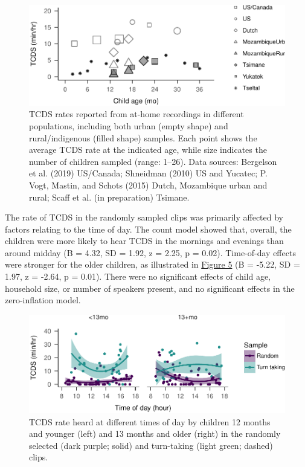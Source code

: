 \documentclass[floatsintext,man]{apa6}
\theoremstyle{definition}
\theoremstyle{definition}
\theoremstyle{definition}
\theoremstyle{remark}
\begin{document}
\begin{figure}
\centering
\includegraphics{Tseltal-CLE_files/figure-latex/fig4-1.pdf}
\caption{\label{fig:fig4}TCDS rates reported from at-home recordings in
different populations, including both urban (empty shape) and
rural/indigenous (filled shape) samples. Each point shows the average
TCDS rate at the indicated age, while size indicates the number of
children sampled (range: 1--26). Data sources: Bergelson et al. (2019)
US/Canada; Shneidman (2010) US and Yucatec; P. Vogt, Mastin, and Schots
(2015) Dutch, Mozambique urban and rural; Scaff et al. (in preparation)
Tsimane.}
\end{figure}

The rate of TCDS in the randomly sampled clips was primarily affected by
factors relating to the time of day. The count model showed that,
overall, the children were more likely to hear TCDS in the mornings and
evenings than around midday (B = 4.32, SD = 1.92, z = 2.25, p = 0.02).
Time-of-day effects were stronger for the older children, as illustrated
in \protect\hyperlink{fig5}{Figure 5} (B = -5.22, SD = 1.97, z = -2.64,
p = 0.01). There were no significant effects of child age, household
size, or number of speakers present, and no significant effects in the
zero-inflation model.

\begin{figure}
\centering
\includegraphics{Tseltal-CLE_files/figure-latex/fig5-1.pdf}
\caption{\label{fig:fig5}TCDS rate heard at different times of day by
children 12 months and younger (left) and 13 months and older (right) in
the randomly selected (dark purple; solid) and turn-taking (light green;
dashed) clips.}
\end{figure}
\end{document}
